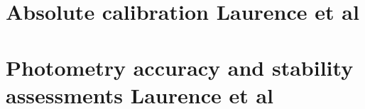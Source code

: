 \documentclass[a4paper, 11pt]{report}
\begin{document}
\chapter{Absolute calibration {\color{blue} Laurence et al}}
\label{se:calibration}


\label{se:cal_HA}



\label{se:ref_flux_primaries}






  

\label{se:aperture_photo_calibration}

\clearpage
\chapter{Photometry accuracy and stability assessments {\color{blue} Laurence et al}}
\label{se:photometry}





%


%


%
\end{document}
